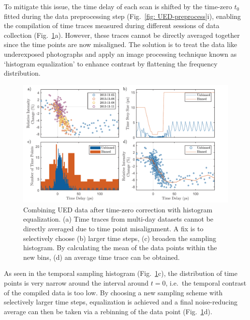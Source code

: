 To mitigate this issue, the time delay of each scan is shifted by the time-zero $t_0$
fitted during the data preprocessing step (Fig.~\ref{fig: UED-preprocess}i),
enabling the compilation of time traces measured
during different sessions of data collection (Fig.~\ref{fig: UED-rebin}a).
%
However, these traces cannot be directly averaged together
since the time points are now misaligned.
The solution is to treat the data like underexposed photographs and
apply an image processing technique known as `histogram equalization'
to enhance contrast by flattening the frequency distribution.
%
\begin{figure}[ht!]
  \centering
  \includegraphics[width = \textwidth]{Figures/fig_UED_rebin.pdf}
  \caption[Combining UED data after time-zero correction with histogram equalization.]{
    Combining UED data after time-zero correction with histogram equalization.
    (a) Time traces from multi-day datasets cannot be directly averaged due to time point misalignment.
    A fix is to selectively choose (b) larger time steps, (c) broaden the sampling histogram.
    By calculating the mean of the data points within the new bins,
    (d) an average time trace can be obtained.
  }
  \label{fig: UED-rebin}
\end{figure}
%
As seen in the temporal sampling histogram (Fig.~\ref{fig: UED-rebin}c),
the distribution of time points is very narrow around the interval around $t = 0$,
i.e.~the temporal contrast of the compiled data is too low.
By choosing a new sampling scheme with selectively larger time steps,
equalization is achieved and a final noise-reducing average can then be taken
via a rebinning of the data point (Fig.~\ref{fig: UED-rebin}d).



